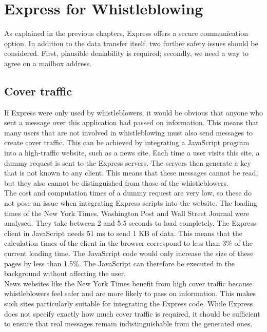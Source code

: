 \documentclass[a4paper]{article}
\begin{document}
\section{Express for Whistleblowing}
As explained in the previous chapters, Express offers a secure communication option.  In addition to the data transfer itself, two further safety issues should be considered. First, plausible deniability is required; secondly, we need a way to agree on a mailbox address. 

\subsection{Cover traffic}
If Express were only used by whistleblowers, it would be obvious that anyone who sent a message over this application had passed on information. This means that many users that are not involved in whistleblowing must also send messages to create cover traffic. This can be achieved by integrating a JavaScript program into a high-traffic website, such as a news site. Each time a user visits this site, a dummy request is sent to the Express servers. The servers then generate a key that is not known to any client. This means that these messages cannot be read, but they also cannot be distinguished from those of the whistleblowers. \\
The cost and computation times of a dummy request are very low, so these do not pose an issue when integrating Express scripts into the website. The loading times of the New York Times, Washington Post and Wall Street Journal were analysed. They take between 2 and 5.5 seconds to load completely. The Express client in JavaScript needs 51 ms to send 1 KB of data. This means that the calculation times of the client in the browser correspond to less than 3\% of the current loading time. The JavaScript code would only increase the size of these pages by less than 1.5\%. The JavaScript can therefore be executed in the background without affecting the user. \\
News websites like the New York Times benefit from high cover traffic because whistleblowers feel safer and are more likely to pass on information. This makes such sites particularly suitable for integrating the Express code. While Express does not specify exactly how much cover traffic is required, it should be sufficient to ensure that real messages remain indistinguishable from the generated ones.
\end{document}
